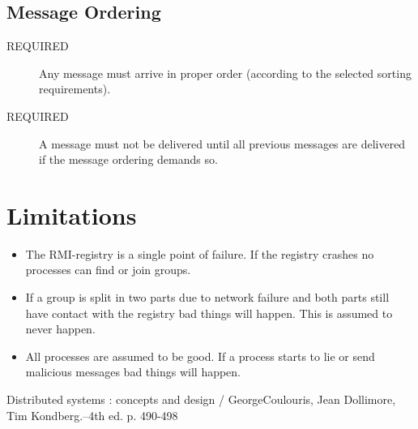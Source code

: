 \documentclass[english]{article}
\begin{document}
\subsection{Message Ordering}
\begin{description}
\item[REQUIRED] Any message must arrive in proper order (according to the selected sorting requirements).

\item[REQUIRED] A message must not be delivered until all previous messages are delivered if the message ordering demands so.
\end{description}



\section{Limitations}
\begin{itemize}
\item The RMI-registry is a single point of failure. If the registry crashes no processes can find or join groups. 

\item If a group is split in two parts due to network failure and both parts still have contact  with the registry bad things will happen. This is assumed to never happen.

\item All processes are assumed to be good. If a process starts to lie or send malicious messages bad things will happen.
\end{itemize}

\begin{thebibliography}{5}

 Distributed systems : concepts and design / GeorgeCoulouris, Jean Dollimore, Tim Kondberg.--4th ed. p. 490-498

\end{thebibliography}
\end{document}
